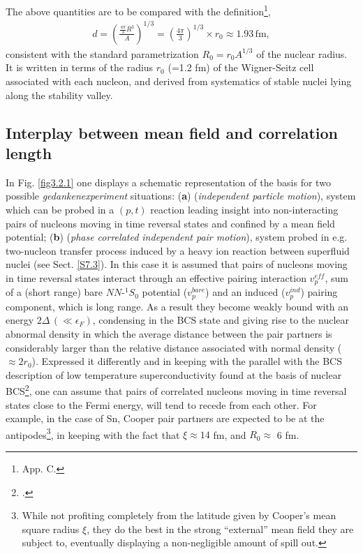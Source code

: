The above quantities are to be compared with the definition\footnote{\cite{Brink:05} App. C.},
\begin{align}\label{eq3.2.27}
d=\left(\frac{\frac{4\pi}{3}R^3}{A}\right)^{1/3}=\left(\frac{4\pi}{3}\right)^{1/3}\times r_0\approx 1.93\, \text{fm},
\end{align} 
consistent with the standard parametrization $R_0=r_0A^{1/3}$ of the nuclear radius. It is written in terms of the  radius $r_0$ (=1.2 fm) of the Wigner-Seitz cell associated with each nucleon, and derived from systematics of stable nuclei lying along the stability valley.
\subsection{Interplay between mean field and correlation length}\label{S4.3.1}
In Fig. \ref{fig3.2.1} one displays a schematic representation of the basis for two possible \textit{gedankenexperiment} situations: (\textbf{a}) (\textit{independent particle motion}), system which can be probed in a $(p,t)$ reaction leading insight into  non-interacting pairs of nucleons moving in time reversal states and confined by a mean field potential; (\textbf{b}) (\textit{phase correlated independent pair motion}), system probed in e.g. two-nucleon transfer process induced by  a heavy ion reaction between superfluid nuclei  (see Sect. \ref{S7.3}). In this case it is assumed that pairs of nucleons moving in time reversal states interact through an effective pairing interaction $v_p^{eff}$, sum of a (short range) bare $NN$-$^1S_0$ potential ($v_p^{bare}$) and an induced ($v_p^{ind}$) pairing component, which is long range. As a result they become weakly bound with an energy $2\Delta\,(\ll\epsilon_F)$, condensing  in the BCS state and giving rise to the nuclear abnormal density in which the average distance between the pair partners is considerably larger than the relative distance associated with normal density ($\approx2r_0$). Expressed it differently and in keeping with the parallel  with the BCS description of low temperature superconductivity found at the basis of nuclear BCS\footnote{\cite{Bohr:58}.}, one can assume that pairs of correlated nucleons moving in time reversal states close to the Fermi energy, will tend to recede from each other. For example, in the case of Sn, Cooper pair partners are expected to be at the antipodes\footnote{While not profiting completely from the latitude given by Cooper's mean square radius $\xi$, they do the best in the strong ``external'' mean field they are subject to, eventually displaying a non-negligible amount of spill out.}, in keeping with the fact that $\xi\approx14$ fm, and $R_0\approx$ 6 fm.

